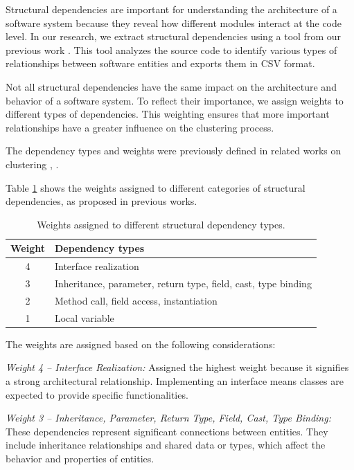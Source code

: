 \documentclass{ieeeaccess}
\begin{document}
Structural dependencies are important for understanding the architecture of a software system because they reveal how different modules interact at the code level. In our research, we extract structural dependencies using a tool from our previous work \cite{b4}. This tool analyzes the source code to identify various types of relationships between software entities and exports them in CSV format.

Not all structural dependencies have the same impact on the architecture and behavior of a software system. To reflect their importance, we assign weights to different types of dependencies. This weighting ensures that more important relationships have a greater influence on the clustering process.

The dependency types and weights were previously defined in related works on clustering \cite{b19}, \cite{b20}.

Table \ref{tab:structural_weights} shows the weights assigned to different categories of structural dependencies, as proposed in previous works.

\begin{table}[htbp]
\centering
\begin{tabular}{|c|l|}
\hline
\textbf{Weight} & \textbf{Dependency types} \\ 
\hline
4 & Interface realization \\
3 & Inheritance, parameter, return type, field, cast, type binding \\ 
2 & Method call, field access, instantiation \\ 
1 & Local variable \\ 
 \hline
\end{tabular}
\caption{Weights assigned to different structural dependency types. \cite{b20}}
\label{tab:structural_weights}
\end{table}

The weights are assigned based on the following considerations:

\textit{Weight 4 – Interface Realization:} Assigned the highest weight because it signifies a strong architectural relationship. Implementing an interface means classes are expected to provide specific functionalities.

\textit{Weight 3 – Inheritance, Parameter, Return Type, Field, Cast, Type Binding:} These dependencies represent significant connections between entities. They include inheritance relationships and shared data or types, which affect the behavior and properties of entities.
\end{document}
